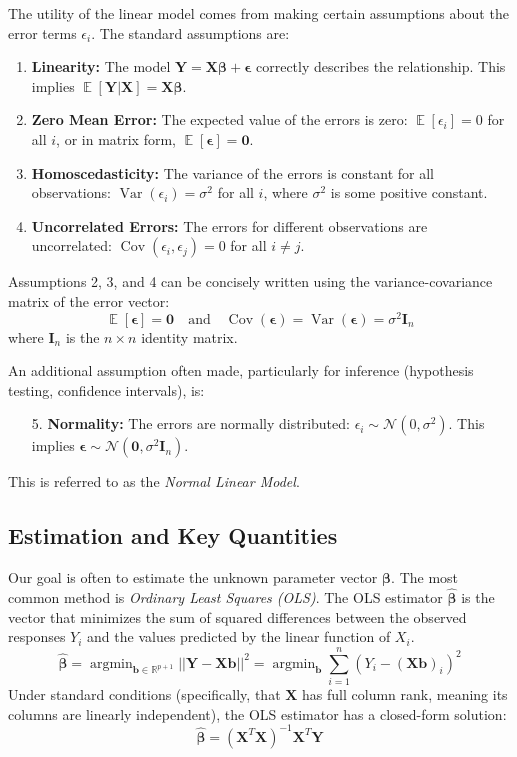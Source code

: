 \documentclass[11pt]{article}
\theoremstyle{definition}
\theoremstyle{remark}
\DeclareMathOperator{\E}{\mathbb{E}}
\DeclareMathOperator{\Var}{\operatorname{Var}}
\DeclareMathOperator{\Cov}{\operatorname{Cov}}
\DeclareMathOperator{\argmin}{\operatorname{argmin}}
\begin{document}
The utility of the linear model comes from making certain assumptions about the error terms $\epsilon_i$. The standard assumptions are:
\begin{enumerate}
    \item \textbf{Linearity:} The model $\bm{Y} = \bm{X}\bm{\beta} + \bm{\epsilon}$ correctly describes the relationship. This implies $\E[\bm{Y} | \bm{X}] = \bm{X}\bm{\beta}$.
    \item \textbf{Zero Mean Error:} The expected value of the errors is zero: $\E[\epsilon_i] = 0$ for all $i$, or in matrix form, $\E[\bm{\epsilon}] = \mathbf{0}$.
    \item \textbf{Homoscedasticity:} The variance of the errors is constant for all observations: $\Var(\epsilon_i) = \sigma^2$ for all $i$, where $\sigma^2$ is some positive constant.
    \item \textbf{Uncorrelated Errors:} The errors for different observations are uncorrelated: $\Cov(\epsilon_i, \epsilon_j) = 0$ for all $i \ne j$.
\end{enumerate}
Assumptions 2, 3, and 4 can be concisely written using the variance-covariance matrix of the error vector:
\[ \E[\bm{\epsilon}] = \mathbf{0} \quad \text{and} \quad \Cov(\bm{\epsilon}) = \Var(\bm{\epsilon}) = \sigma^2 \bm{I}_n \]
where $\bm{I}_n$ is the $n \times n$ identity matrix.

An additional assumption often made, particularly for inference (hypothesis testing, confidence intervals), is:
\begin{enumerate}
    \item[5.] \textbf{Normality:} The errors are normally distributed: $\epsilon_i \sim \mathcal{N}(0, \sigma^2)$. This implies $\bm{\epsilon} \sim \mathcal{N}(\mathbf{0}, \sigma^2 \bm{I}_n)$.
\end{enumerate}
This is referred to as the \emph{Normal Linear Model}.

\subsection{Estimation and Key Quantities}

Our goal is often to estimate the unknown parameter vector $\bm{\beta}$. The most common method is \emph{Ordinary Least Squares (OLS)}. The OLS estimator $\hat{\bm{\beta}}$ is the vector that minimizes the sum of squared differences between the observed responses $Y_i$ and the values predicted by the linear function of $X_i$.
\[ \hat{\bm{\beta}} = \argmin_{\bm{b} \in \mathbb{R}^{p+1}} ||\bm{Y} - \bm{X}\bm{b}||^2 = \argmin_{\bm{b}} \sum_{i=1}^n (Y_i - (\bm{X}\bm{b})_i)^2 \]
Under standard conditions (specifically, that $\bm{X}$ has full column rank, meaning its columns are linearly independent), the OLS estimator has a closed-form solution:
\[ \boxed{\hat{\bm{\beta}} = (\bm{X}^T\bm{X})^{-1}\bm{X}^T\bm{Y}} \]
\end{document}
